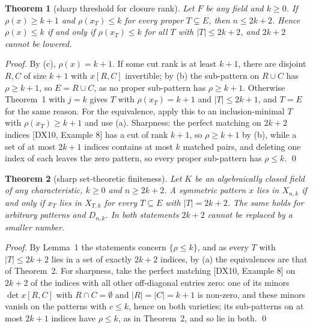\documentclass[11pt,letterpaper,reqno]{amsart}
\theoremstyle{spaced}
\newtheorem{theorem}{Theorem}
\begin{document}
\begin{theorem}[sharp threshold for closure rank]
Let \(F\) be any field and \(k \ge 0\). If \(\rho(x) \ge k+1\) and \(\rho(x_T) \le k\) for every proper \(T \subsetneq E\), then \(n \le 2k+2\). Hence \(\rho(x) \le k\) if and only if \(\rho(x_T) \le k\) for all \(T\) with \(\lvert T\rvert \le 2k+2\), and \(2k+2\) cannot be lowered.
\end{theorem}

\emph{Proof.} By (c), \(\rho(x) = k+1\). If some cut rank is at least \(k+1\), there are disjoint \(R, C\) of size \(k+1\) with \(x[R, C]\) invertible; by (b) the sub-pattern on \(R \cup C\) has \(\rho \ge k+1\), so \(E = R \cup C\), as no proper sub-pattern has \(\rho \ge k+1\). Otherwise Theorem~1 with \(j = k\) gives \(T\) with \(\rho(x_T) = k+1\) and \(\lvert T\rvert \le 2k+1\), and \(T = E\) for the same reason. For the equivalence, apply this to an inclusion-minimal \(T\) with \(\rho(x_T) \ge k+1\) and use (a). Sharpness: the perfect matching on \(2k+2\) indices {[}DX10, Example 8{]} has a cut of rank \(k+1\), so \(\rho \ge k+1\) by (b), while a set of at most \(2k+1\) indices contains at most \(k\) matched pairs, and deleting one index of each leaves the zero pattern, so every proper sub-pattern has \(\rho \le k\). \qed

\begin{theorem}[sharp set-theoretic finiteness]
Let \(K\) be an algebraically closed field of any characteristic, \(k \ge 0\) and \(n \ge 2k+2\). A symmetric pattern \(x\) lies in \(X_{n,k}\) if and only if \(x_T\) lies in \(X_{T,k}\) for every \(T \subseteq E\) with \(\lvert T\rvert = 2k+2\). The same holds for arbitrary patterns and \(D_{n,k}\). In both statements \(2k+2\) cannot be replaced by a smaller number.
\end{theorem}

\emph{Proof.} By Lemma~1 the statements concern \(\{\rho \le k\}\), and as every \(T\) with \(\lvert T\rvert \le 2k+2\) lies in a set of exactly \(2k+2\) indices, by (a) the equivalences are that of Theorem~2. For sharpness, take the perfect matching {[}DX10, Example 8{]} on \(2k+2\) of the indices with all other off-diagonal entries zero: one of its minors \(\det x[R, C]\) with \(R \cap C = \emptyset\) and \(\lvert R\rvert = \lvert C\rvert = k+1\) is non-zero, and these minors vanish on the patterns with \(c \le k\), hence on both varieties; its sub-patterns on at most \(2k+1\) indices have \(\rho \le k\), as in Theorem~2, and so lie in both. \qed
\end{document}
